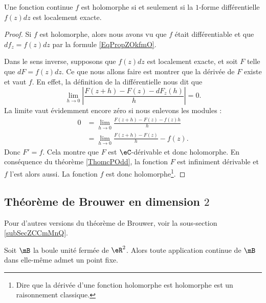 \begin{proposition}\label{PropZOkfmO}
    Une fonction continue \( f\) est holomorphe si et seulement si la \( 1\)-forme différentielle \( f(z)dz\) est localement exacte.
\end{proposition}

\begin{proof}
    Si \( f\) est holomorphe, alors nous avons vu que \( f\) était différentiable et que \( df_{z}=f(z)dz\) par la formule \ref{EqPropZOkfmO}.

    Dans le sens inverse, supposons que \( f(z)dz\) est localement exacte, et soit \( F\) telle que \( dF=f(z)dz\). Ce que nous allons faire est montrer que la dérivée de \( F\) existe et vaut \( f\). En effet, la définition de la différentielle nous dit que
    \begin{equation}
        \lim_{h\to 0} \left| \frac{ F(z+h)-F(z)-dF_z(h) }{ h } \right| =0.
    \end{equation}
    La limite vaut évidemment encore zéro si nous enlevons les modules :
    \begin{subequations}
        \begin{align}
            0&=\lim_{h\to 0} \frac{ F(z+h)-F(z)-f(z)h }{ h }\\
            &=\lim_{h\to 0} \frac{ F(z+h)-F(z) }{ h }-f(z).
        \end{align}
    \end{subequations}
    Donc \( F'=f\). Cela montre que \( F\) est \( \eC\)-dérivable et donc holomorphe. En conséquence du théorème \ref{ThomcPOdd}, la fonction \( F\) est infiniment dérivable et \( f\) l'est alors aussi. La fonction \( f\) est donc holomorphe\footnote{Dire que la dérivée d'une fonction holomorphe est holomorphe est un raisonnement classique.}.
\end{proof}

\subsection{Théorème de Brouwer en dimension \texorpdfstring{$ 2$}{2}}
Pour d'autres versions du théorème de Brouwer, voir la sous-section \ref{subSecZCCmMnQ}.

\begin{theorem}     \label{ThoLVViheK}
    Soit \( \mB\) la boule unité fermée de \( \eR^2\). Alors toute application continue de \( \mB\) dans elle-même admet un point fixe.
\end{theorem}

